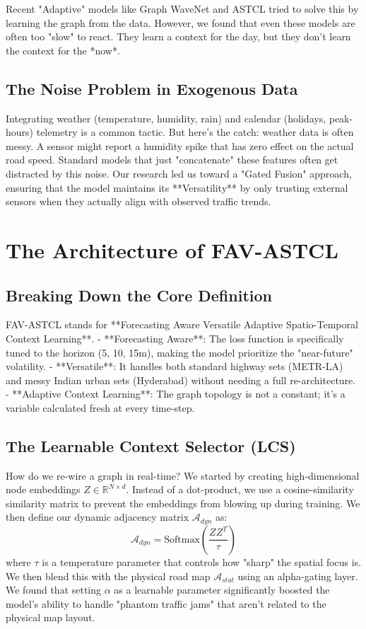\documentclass[11pt,a4paper]{article}
\begin{document}
Recent "Adaptive" models like Graph WaveNet and ASTCL tried to solve this by learning the graph from the data. However, we found that even these models are often too "slow" to react. They learn a context for the day, but they don't learn the context for the *now*.

\subsection{The Noise Problem in Exogenous Data}
Integrating weather (temperature, humidity, rain) and calendar (holidays, peak-hours) telemetry is a common tactic. But here's the catch: weather data is often messy. A sensor might report a humidity spike that has zero effect on the actual road speed. Standard models that just "concatenate" these features often get distracted by this noise. Our research led us toward a "Gated Fusion" approach, ensuring that the model maintains its **Versatility** by only trusting external sensors when they actually align with observed traffic trends.

\section{The Architecture of FAV-ASTCL}
\subsection{Breaking Down the Core Definition}
FAV-ASTCL stands for **Forecasting Aware Versatile Adaptive Spatio-Temporal Context Learning**. 
- **Forecasting Aware**: The loss function is specifically tuned to the horizon (5, 10, 15m), making the model prioritize the "near-future" volatility.
- **Versatile**: It handles both standard highway sets (METR-LA) and messy Indian urban sets (Hyderabad) without needing a full re-architecture.
- **Adaptive Context Learning**: The graph topology is not a constant; it’s a variable calculated fresh at every time-step.

\subsection{The Learnable Context Selector (LCS)}
How do we re-wire a graph in real-time? We started by creating high-dimensional node embeddings $Z \in \mathbb{R}^{N \times d}$. 
Instead of a dot-product, we use a cosine-similarity similarity matrix to prevent the embeddings from blowing up during training. We then define our dynamic adjacency matrix $\mathcal{A}_{dyn}$ as:
\begin{equation}
    \mathcal{A}_{dyn} = \text{Softmax}\left(\frac{Z Z^T}{\tau}\right)
\end{equation}
where $\tau$ is a temperature parameter that controls how "sharp" the spatial focus is. 
We then blend this with the physical road map $\mathcal{A}_{stat}$ using an alpha-gating layer. We found that setting $\alpha$ as a learnable parameter significantly boosted the model's ability to handle "phantom traffic jams" that aren't related to the physical map layout.
\end{document}

